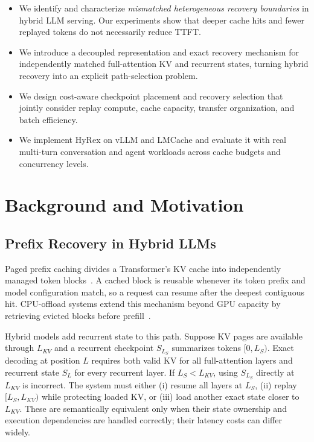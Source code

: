 \documentclass[sigconf,anonymous,review]{acmart}
\begin{document}
\begin{itemize}
  \item We identify and characterize \emph{mismatched heterogeneous recovery
  boundaries} in hybrid LLM serving.  Our experiments show that deeper cache hits
  and fewer replayed tokens do not necessarily reduce TTFT.

  \item We introduce a decoupled representation and exact recovery mechanism
  for independently matched full-attention KV and recurrent states, turning
  hybrid recovery into an explicit path-selection problem.

  \item We design cost-aware checkpoint placement and recovery selection that
  jointly consider replay compute, cache capacity, transfer organization, and
  batch efficiency.

  \item We implement HyRex on vLLM and LMCache and evaluate it with real
  multi-turn conversation and agent workloads across cache budgets and
  concurrency levels.
\end{itemize}

\section{Background and Motivation}
\label{sec:motivation}

\subsection{Prefix Recovery in Hybrid LLMs}

Paged prefix caching divides a Transformer's KV cache into independently
managed token blocks~\cite{kwon2023vllm}.  A cached block is reusable whenever
its token prefix and model configuration match, so a request can resume after
the deepest contiguous hit.  CPU-offload systems extend this mechanism beyond
GPU capacity by retrieving evicted blocks before prefill~\cite{cheng2025lmcache}.

Hybrid models add recurrent state to this path.  Suppose KV pages are available
through $L_{KV}$ and a recurrent checkpoint $S_{L_S}$ summarizes tokens
$[0,L_S)$.  Exact decoding at position $L$ requires both valid KV for all
full-attention layers and recurrent state $S_L$ for every recurrent layer.  If
$L_S < L_{KV}$, using $S_{L_S}$ directly at $L_{KV}$ is incorrect.  The system
must either (i) resume all layers at $L_S$, (ii) replay $[L_S,L_{KV})$ while
protecting loaded KV, or (iii) load another exact state closer to $L_{KV}$.
These are semantically equivalent only when their state ownership and execution
dependencies are handled correctly; their latency costs can differ widely.
\end{document}
